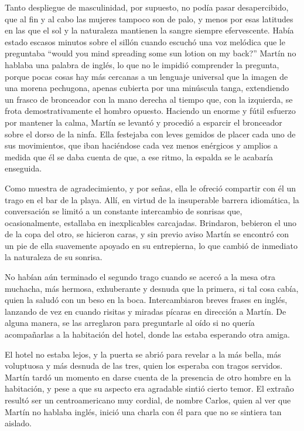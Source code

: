 \documentclass[11pt,twoside,openright,a6paper]{book}
\begin{document}
Tanto despliegue de masculinidad, por supuesto, no podía pasar desapercibido,
que al fin y al cabo las mujeres tampoco son de palo, y menos por esas
latitudes en las que el sol y la naturaleza mantienen la sangre siempre
efervescente. Había estado escasos minutos sobre el sillón cuando escuchó
una voz melódica que le preguntaba “would you mind spreading some sun
lotion on my back?” Martín no hablaba una palabra de inglés, lo que no
le impidió comprender la pregunta, porque pocas cosas hay más cercanas a
un lenguaje universal que la imagen de una morena pechugona, apenas cubierta
por una minúscula tanga, extendiendo un frasco de bronceador con la mano
derecha al tiempo que, con la izquierda, se frota demostrativamente el
hombro opuesto. Haciendo un enorme y fútil esfuerzo por mantener la calma,
Martín se levantó y procedió a esparcir el bronceador sobre el dorso de la
ninfa. Ella festejaba con leves gemidos de placer cada uno de sus movimientos,
que iban haciéndose cada vez menos enérgicos y amplios a medida que él
se daba cuenta de que, a ese ritmo, la espalda se le acabaría enseguida.

Como muestra de agradecimiento, y por señas, ella le ofreció
compartir con él un trago en el bar de la playa. Allí, en virtud de la
insuperable barrera idiomática, la conversación se limitó a un constante
intercambio de sonrisas que, ocasionalmente, estallaba en inexplicables
carcajadas. Brindaron, bebieron el uno de la copa del otro, se hicieron caras,
y sin previo aviso Martín se encontró con un pie de ella suavemente apoyado
en su entrepierna, lo que cambió de inmediato la naturaleza de su sonrisa.

No habían aún terminado el segundo trago cuando se acercó a la mesa
otra muchacha, más hermosa, exhuberante y desnuda que la primera, si tal
cosa cabía, quien la saludó con un beso en la boca. Intercambiaron breves
frases en inglés, lanzando de vez en cuando risitas y miradas pícaras en
dirección a Martín. De alguna manera, se las arreglaron para preguntarle
al oído si no quería acompañarlas a la habitación del hotel, donde las
estaba esperando otra amiga.

El hotel no estaba lejos, y la puerta se abrió para revelar a la más bella,
más voluptuosa y más desnuda de las tres, quien los esperaba con tragos
servidos. Martín tardó un momento en darse cuenta de la presencia de otro
hombre en la habitación, y pese a que su aspecto era agradable sintió
cierto temor. El extraño resultó ser un centroamericano muy cordial,
de nombre Carlos, quien al ver que Martín no hablaba inglés, inició una
charla con él para que no se sintiera tan aislado.
\end{document}
